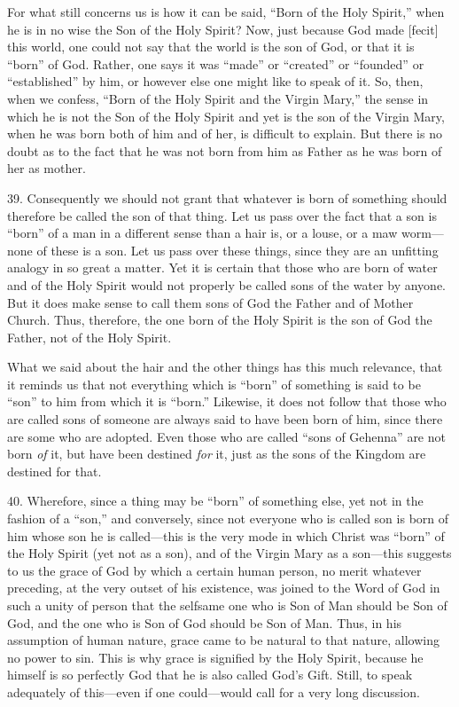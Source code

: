 For what still concerns us is how it can be said, ``Born of the Holy Spirit,'' when he is in no wise the Son of the Holy Spirit? Now, just because God made [fecit] this world, one could not say that the world is the son of God, or that it is ``born'' of God. Rather, one says it was ``made'' or ``created'' or ``founded'' or ``established'' by him, or however else one might like to speak of it. So, then, when we confess, ``Born of the Holy Spirit and the Virgin Mary,'' the sense in which he is not the Son of the Holy Spirit and yet is the son of the Virgin Mary, when he was born both of him and of her, is difficult to explain. But there is no doubt as to the fact that he was not born from him as Father as he was born of her as mother.

39. Consequently we should not grant that whatever is born of something should therefore be called the son of that thing. Let us pass over the fact that a son is ``born'' of a man in a different sense than a hair is, or a louse, or a maw worm—none of these is a son. Let us pass over these things, since they are an unfitting analogy in so great a matter. Yet it is certain that those who are born of water and of the Holy Spirit would not properly be called sons of the water by anyone. But it does make sense to call them sons of God the Father and of Mother Church. Thus, therefore, the one born of the Holy Spirit is the son of God the Father, not of the Holy Spirit.

What we said about the hair and the other things has this much relevance, that it reminds us that not everything which is ``born'' of something is said to be ``son'' to him from which it is ``born.'' Likewise, it does not follow that those who are called sons of someone are always said to have been born of him, since there are some who are adopted. Even those who are called ``sons of Gehenna'' are not born \emph{of} it, but have been destined \emph{for} it, just as the sons of the Kingdom are destined for that.

40. Wherefore, since a thing may be ``born'' of something else, yet not in the fashion of a ``son,'' and conversely, since not everyone who is called son is born of him whose son he is called—this is the very mode in which Christ was ``born'' of the Holy Spirit (yet not as a son), and of the Virgin Mary as a son—this suggests to us the grace of God by which a certain human person, no merit whatever preceding, at the very outset of his existence, was joined to the Word of God in such a unity of person that the selfsame one who is Son of Man should be Son of God, and the one who is Son of God should be Son of Man. Thus, in his assumption of human nature, grace came to be natural to that nature, allowing no power to sin. This is why grace is signified by the Holy Spirit, because he himself is so perfectly God that he is also called God's Gift. Still, to speak adequately of this—even if one could—would call for a very long discussion.

